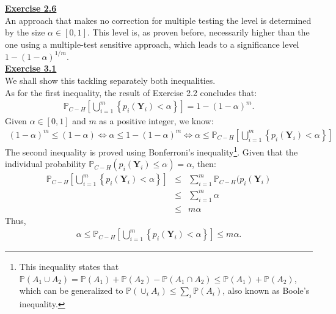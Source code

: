 \documentclass[a4paper, 11pt]{article}
\begin{document}
\newline \textbf{\underline{Exercise 2.6}}\\
\newline An approach that makes no correction for multiple testing the level is determined by the size $\alpha \in [0,1]$. This level is, as proven before, necessarily higher than the one using a multiple-test sensitive approach, which leads to a significance level $1 - (1- \alpha)^{1/m}$.\\
\newline \textbf{\underline{Exercise 3.1}}\\
\newline We shall show this tackling separately both inequalities.\\
\newline As for the first inequality, the result of Exercise 2.2 concludes that:\begin{eqnarray}
\mathbb{P}_{C-H} \left[ \bigcup_{i=1}^{m} \left\lbrace p_i(\mathbf{Y}_i) < \alpha \right\rbrace \right] = 1 - (1-\alpha)^m. \nonumber
\end{eqnarray}
Given $\alpha \in [0,1]$ and $m$ as a positive integer, we know:
\begin{eqnarray}
(1-\alpha)^m \leq (1 - \alpha) \Leftrightarrow \alpha \leq 1 - (1-\alpha)^m \Leftrightarrow \alpha \leq \mathbb{P}_{C-H} \left[ \bigcup_{i=1}^{m} \left\lbrace p_i(\mathbf{Y}_i) < \alpha \right\rbrace \right] \nonumber
\end{eqnarray}
The second inequality is proved using Bonferroni's inequality\footnote{This inequality states that $\mathbb{P}(A_1 \cup A_2) = \mathbb{P}(A_1) + \mathbb{P}(A_2) - \mathbb{P}(A_1 \cap A_2) \leq \mathbb{P}(A_1) + \mathbb{P}(A_2)$, which can be generalized to $\mathbb{P}(\cup_i A_i) \leq \sum_i \mathbb{P}(A_i)$, also known as Boole's inequality.}. Given that the individual probability $\mathbb{P}_{C-H}(p_{i}(\mathbf{Y}_i) \leq \alpha) = \alpha$, then:
\begin{eqnarray}
\mathbb{P}_{C-H} \left[ \bigcup_{i=1}^{m} \left\{ p_i(\mathbf{Y}_i) < \alpha \right\} \right] &\leq& \sum_{i=1}^{m} \mathbb{P}_{C-H} (p_i(\mathbf{Y}_i) \nonumber \\
&\leq& \sum_{i=1}^{m} \alpha  \nonumber \\
&\leq& m \alpha \nonumber
\end{eqnarray}
Thus,
\begin{eqnarray}
\alpha \leq \mathbb{P}_{C-H} \left[ \bigcup_{i=1}^{m} \left\{ p_i(\mathbf{Y}_i) < \alpha \right\} \right] \leq m \alpha. \nonumber
\end{eqnarray}
\end{document}
